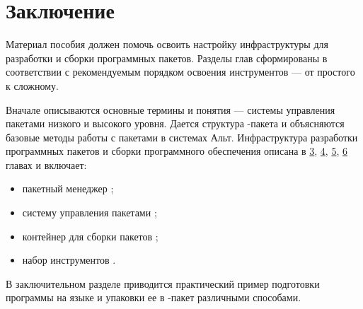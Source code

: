 \chapter*{Заключение}
Материал пособия должен помочь освоить настройку инфраструктуры для разработки и сборки программных пакетов. Разделы глав сформированы в соответствии с рекомендуемым порядком освоения инструментов --- от простого к сложному. 

Вначале описываются основные термины и понятия --- системы управления пакетами низкого и высокого уровня. Дается структура -пакета и объясняются базовые методы работы с пакетами в системах Альт. Инфраструктура разработки программных пакетов и сборки программного обеспечения описана в \hyperlink{3}{3}, \hyperlink{4}{4}, \hyperlink{5}{5}, \hyperlink{6}{6} главах и включает:
\begin{itemize}
	\item пакетный менеджер ;
	\item систему управления пакетами ;
	\item контейнер для сборки пакетов ;
	\item набор инструментов .
\end{itemize}

В заключительном разделе приводится практический пример подготовки программы на языке  и упаковки ее в -пакет различными способами. 